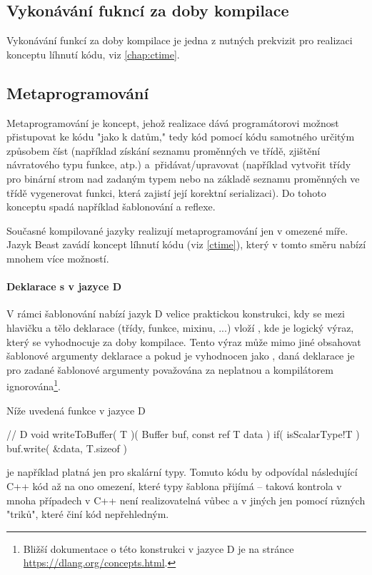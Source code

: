 \subsection{Vykonávání fukncí za doby kompilace}
Vykonávání funkcí za doby kompilace je jedna z nutných prekvizit pro realizaci konceptu líhnutí kódu, viz \autoref{chap:ctime}.

\subsection{Metaprogramování} \label{metaprogramming}
Metaprogramování je koncept, jehož realizace dává programátorovi možnost přistupovat ke kódu "jako k datům," tedy kód pomocí kódu samotného určitým způsobem číst (například získání seznamu proměnných ve třídě, zjištění návratového typu funkce, atp.) a~přidávat/upravovat (například vytvořit třídy pro binární strom nad zadaným typem nebo na základě seznamu proměnných ve třídě vygenerovat funkci, která zajistí její korektní serializaci). Do tohoto konceptu spadá například šablonování a reflexe.

Současné kompilované jazyky realizují metaprogramování jen v omezené míře. Jazyk Beast zavádí koncept líhnutí kódu (viz \autoref{ctime}), který v tomto směru nabízí mnohem více možností.

\paragraph{Deklarace s  v jazyce D}
V rámci šablonování nabízí jazyk D velice praktickou konstrukci, kdy se mezi hlavičku a tělo deklarace (třídy, funkce, mixinu, ...) vloží , kde  je logický výraz, který se vyhodnocuje za doby kompilace. Tento výraz může mimo jiné obsahovat šablonové argumenty deklarace a pokud je vyhodnocen jako , daná deklarace je pro zadané šablonové argumenty považována za neplatnou a kompilátorem ignorována\footnote{Bližší dokumentace o této konstrukci v jazyce D je na stránce \url{https://dlang.org/concepts.html}.}.

Níže uvedená funkce v jazyce D
\begin{dcode}
// D
void writeToBuffer( T )( Buffer buf, const ref T data )
	if( isScalarType!T )
{
	buf.write( &data, T.sizeof )
}
\end{dcode}
je například platná jen pro skalární typy. Tomuto kódu by odpovídal následující C++ kód až na ono omezení, které typy šablona přijímá -- taková kontrola v mnoha případech v C++ není realizovatelná vůbec a v jiných jen pomocí různých "triků", které činí kód nepřehledným.

